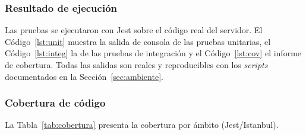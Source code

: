 \documentclass[stu,11pt,floatsintext]{apa7}
\begin{document}
\subsubsection{Resultado de ejecución}
Las pruebas se ejecutaron con Jest sobre el código real del servidor. El
Código~\ref{lst:unit} muestra la salida de consola de las pruebas unitarias, el
Código~\ref{lst:integ} la de las pruebas de integración y el Código~\ref{lst:cov} el
informe de cobertura. Todas las salidas son reales y reproducibles con los \emph{scripts}
documentados en la Sección~\ref{sec:ambiente}.







\subsubsection{Cobertura de código}
La Tabla~\ref{tab:cobertura} presenta la cobertura por ámbito (Jest/Istanbul).
\end{document}
